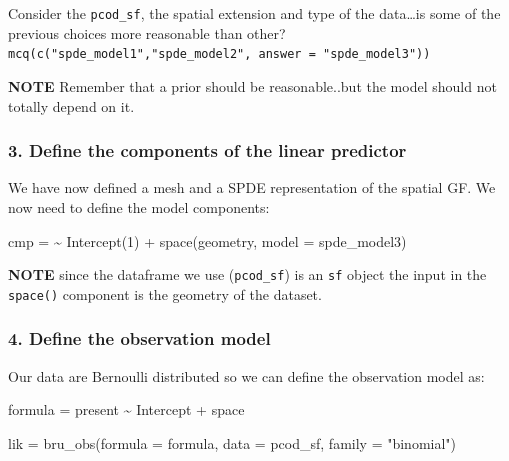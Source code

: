 \documentclass[
  letterpaper,
  DIV=11,
  numbers=noendperiod]{scrartcl}
\newenvironment{Shaded}{\begin{snugshade}}{\end{snugshade}}
\newcommand{\AttributeTok}[1]{\textcolor[rgb]{0.40,0.45,0.13}{#1}}
\newcommand{\DecValTok}[1]{\textcolor[rgb]{0.68,0.00,0.00}{#1}}
\newcommand{\ErrorTok}[1]{\textcolor[rgb]{0.68,0.00,0.00}{#1}}
\newcommand{\FunctionTok}[1]{\textcolor[rgb]{0.28,0.35,0.67}{#1}}
\newcommand{\NormalTok}[1]{\textcolor[rgb]{0.00,0.23,0.31}{#1}}
\newcommand{\OtherTok}[1]{\textcolor[rgb]{0.00,0.23,0.31}{#1}}
\newcommand{\SpecialCharTok}[1]{\textcolor[rgb]{0.37,0.37,0.37}{#1}}
\newcommand{\StringTok}[1]{\textcolor[rgb]{0.13,0.47,0.30}{#1}}
\begin{document}
\begin{tcolorbox}[enhanced jigsaw, opacityback=0, bottomtitle=1mm, opacitybacktitle=0.6, titlerule=0mm, left=2mm, bottomrule=.15mm, colframe=quarto-callout-tip-color-frame, rightrule=.15mm, toprule=.15mm, title={Question}, colbacktitle=quarto-callout-tip-color!10!white, leftrule=.75mm, colback=white, breakable, arc=.35mm, toptitle=1mm, coltitle=black]

Consider the \texttt{pcod\_sf}, the spatial extension and type of the
data\ldots is some of the previous choices more reasonable than other?
\texttt{mcq(c("spde\_model1","spde\_model2",\ answer\ =\ "spde\_model3"))}

\textbf{NOTE} Remember that a prior should be reasonable..but the model
should not totally depend on it.

\end{tcolorbox}

\subsubsection{3. Define the components of the linear
predictor}\label{define-the-components-of-the-linear-predictor}

We have now defined a mesh and a SPDE representation of the spatial GF.
We now need to define the model components:

\begin{Shaded}
\begin{Highlighting}[]
\NormalTok{cmp }\OtherTok{=} \ErrorTok{\textasciitilde{}} \FunctionTok{Intercept}\NormalTok{(}\DecValTok{1}\NormalTok{) }\SpecialCharTok{+} \FunctionTok{space}\NormalTok{(geometry, }\AttributeTok{model =}\NormalTok{ spde\_model3)}
\end{Highlighting}
\end{Shaded}

\textbf{NOTE} since the dataframe we use (\texttt{pcod\_sf}) is an
\texttt{sf} object the input in the \texttt{space()} component is the
geometry of the dataset.

\subsubsection{4. Define the observation
model}\label{define-the-observation-model}

Our data are Bernoulli distributed so we can define the observation
model as:

\begin{Shaded}
\begin{Highlighting}[]
\NormalTok{formula }\OtherTok{=}\NormalTok{ present }\SpecialCharTok{\textasciitilde{}}\NormalTok{ Intercept  }\SpecialCharTok{+}\NormalTok{ space}

\NormalTok{lik }\OtherTok{=} \FunctionTok{bru\_obs}\NormalTok{(}\AttributeTok{formula =}\NormalTok{ formula, }
              \AttributeTok{data =}\NormalTok{ pcod\_sf, }
              \AttributeTok{family =} \StringTok{"binomial"}\NormalTok{)}
\end{Highlighting}
\end{Shaded}
\end{document}
